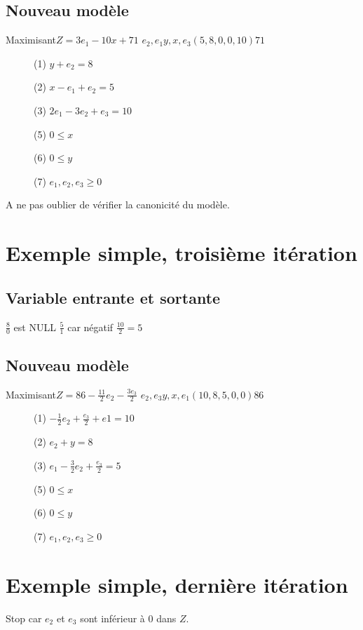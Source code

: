 \subsection{Nouveau modèle}
        {Maximisant}{$Z = 3e_1 - 10x + 71$}
        {$e_2,e_1$}{$y,x,e_3$}{$(5,8,0,0,10)$}{$71$}
        {\begin{description}
\item[] (1) $y + e_2 = 8$
\item[] (2) $x - e_1 + e_2 = 5$
\item[] (3) $2e_1 - 3e_2 + e_3 = 10$
\item[] (5) $ 0 \leq x$
\item[] (6) $ 0 \leq y$
\item[] (7) $ e_1,e_2,e_3 \geq 0$
\end{description}
}

A ne pas oublier de vérifier la canonicité du modèle.\\

\section{Exemple simple, troisième itération}
\subsection{Variable entrante et sortante}
  {$\frac{8}{0}$ est NULL}
  {$\frac{5}{1}$ car négatif}
  {$\frac{10}{2} = 5$}

\subsection{Nouveau modèle}
        {Maximisant}{$Z = 86 - \frac{11}{2}e_2 - \frac{3e_3}{2}$}
        {$e_2,e_3$}{$y,x,e_1$}{$(10,8,5,0,0)$}{$86$}
        {\begin{description}
\item[] (1) $- \frac{1}{2}e_2 + \frac{e_3}{2} + e1 = 10$
\item[] (2) $e_2 + y = 8$
\item[] (3) $e_1 - \frac{3}{2}e_2 + \frac{e_3}{2} = 5$
\item[] (5) $ 0 \leq x$
\item[] (6) $ 0 \leq y$
\item[] (7) $ e_1,e_2,e_3 \geq 0$
\end{description}
}
\section{Exemple simple, dernière itération}
Stop car $e_2$ et $e_3$ sont inférieur à 0 dans $Z$.

